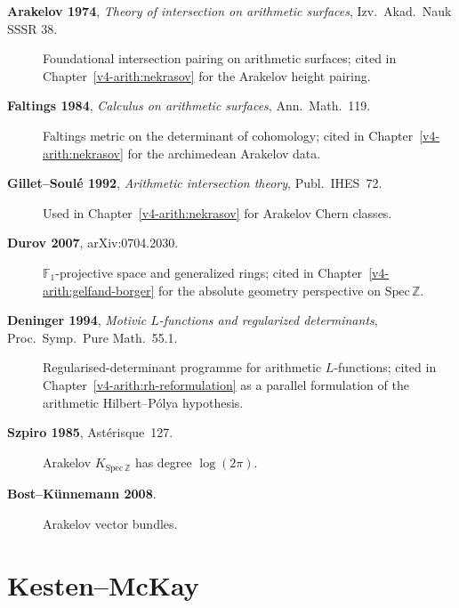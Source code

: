 \begin{description}
\item[\textbf{Arakelov 1974}, \emph{Theory of intersection on
arithmetic surfaces}, Izv.~Akad.~Nauk SSSR 38.] Foundational
intersection pairing on arithmetic surfaces; cited in
Chapter~\ref{v4-arith:nekrasov} for the Arakelov height
pairing.
\item[\textbf{Faltings 1984}, \emph{Calculus on arithmetic
surfaces}, Ann.~Math.~119.] Faltings metric on the determinant of
cohomology; cited in Chapter~\ref{v4-arith:nekrasov} for the
archimedean Arakelov data.
\item[\textbf{Gillet--Soul\'e 1992}, \emph{Arithmetic intersection
theory}, Publ.~IHES~72.] Used in Chapter~\ref{v4-arith:nekrasov} for
Arakelov Chern classes.
\item[\textbf{Durov 2007}, arXiv:0704.2030.] \(\mathbb{F}_{1}\)-projective
space and generalized rings; cited in
Chapter~\ref{v4-arith:gelfand-borger} for the absolute
geometry perspective on \(\mathrm{Spec}\,\mathbb{Z}\).
\item[\textbf{Deninger 1994}, \emph{Motivic \(L\)-functions and
regularized determinants}, Proc.~Symp.~Pure Math.~55.1.]
Regularised-determinant programme for arithmetic \(L\)-functions;
cited in Chapter~\ref{v4-arith:rh-reformulation} as a parallel
formulation of the arithmetic Hilbert--P\'olya hypothesis.
\item[\textbf{Szpiro 1985}, Ast\'erisque~127.] Arakelov
\(K_{\overline{\mathrm{Spec}\,\mathbb{Z}}}\) has degree \(\log(2\pi)\).
\item[\textbf{Bost--K\"unnemann 2008}.] Arakelov
vector bundles.
\end{description}

\section{Kesten--McKay}
\label{v4-arith:app:A:kesten-mckay}

